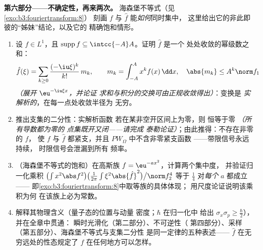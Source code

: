 \begin{problem}[{周末问题——$\partial_tu =
\partial^2_{xx}u$，从头到尾求解}]
\medskip
\noindent\textbf{第六部分——不确定性，再来两次。}
海森堡不等式（见\cref{exo:b3:fouriertransform:8}）
刻画 $f$ 与 $\hat f$ 能\emph{如何}同时集中，
这里给出它的非此即彼的“姊妹”结论，以及它的
精确饱和情形。
\begin{enumerate}[resume]
  \item 设 $f \in L^1$，且 $\operatorname{supp}f \subseteq
        \intcc{-A}A$。证明 $\hat f$ 是一个
        处处收敛的幂级数之和：
        \[
        \hat f(\xi) = \sum_{k\geq0}\frac{(-\iu\xi)^k}{k!}
        \,m_k, \qquad m_k = \int_{-A}^{A}x^kf(x)\,\dd x,
        \quad \abs{m_k} \leq A^k\norm f_1
        \]
        \emph{（展开 $\eu^{-\iu\xi x}$，并论证
        求和与积分的交换可由正规收敛得出）}：变换是
        \emph{实解析的}，在每一点处收敛半径为
        无穷。
  \item 推出支集的二分性：实解析函数
        若在某非空开区间上为零，则
        恒等于零 \emph{（所有导数都为零的
        点集既开又闭——请完成
        泰勒论证）}；由此推得：不存在非零的 $f$，
        使 $f$ 与 $\hat f$ 都紧支，并且
        $PW_\Omega$ 中不含非零紧支函数
——带限信号永远持续，
        时限信号会泄漏到所有
        频率。
  \item （海森堡不等式的饱和）在高斯族 $f
        = \eu^{-ax^2}$，计算两个集中度，
        并验证归一化乘积
        $\bigl(\int x^2\abs f^2\bigr)\bigl(\frac1{2\pi}\int
        \xi^2\abs{\hat f}^2\bigr)\big/\norm f_2^4$ 等于
        $\frac14$ 对\emph{每个} $a$ 都成立——
        即\cref{exo:b3:fouriertransform:8}中取等族的具体体现；
        用尺度论证说明该乘积为何
        在该族上必为常数。
  \item 解释其物理含义（量子态的位置与动量
        密度；$\hbar$ 在归一化中
        给出 $\sigma_x\sigma_p \geq
        \frac\hbar2$），并在全章中贯通：
        瞬时光滑化（第二部分）、不可逆性（
        第四部分）、采样（第五部分）、海森堡不等式与支集二分性
        是同一定律的五种表述——
        $\hat f$ 在无穷远处的性态规定了 $f$
        在任何地方可以怎样。
\end{enumerate}


\end{problem}
